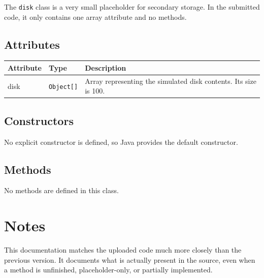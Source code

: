 \documentclass[12pt,a4paper]{article}
\begin{document}
\begin{purposebox}
The \texttt{disk} class is a very small placeholder for secondary storage. In the submitted code, it only contains one array attribute and no methods.
\end{purposebox}

\subsection{Attributes}

\begin{tabularx}{\textwidth}{p{4cm} p{3cm} Y}
\toprule
\textbf{Attribute} & \textbf{Type} & \textbf{Description} \\
\midrule
disk & \texttt{Object[]} & Array representing the simulated disk contents. Its size is 100. \\
\bottomrule
\end{tabularx}

\subsection{Constructors}

No explicit constructor is defined, so Java provides the default constructor.

\subsection{Methods}

No methods are defined in this class.

\section{Notes}

This documentation matches the uploaded code much more closely than the previous version.  
It documents what is actually present in the source, even when a method is unfinished, placeholder-only, or partially implemented.
\end{document}
